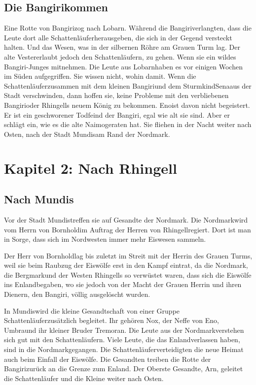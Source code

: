 \documentclass[12pt,a4paper,onecolumn,twoside,ngerman]{book}
\newcommand{\Sena}{Sena}
\newcommand{\Sturmkind}{Sturmkind}
\newcommand{\Bangiri}{Bangiri}
\newcommand{\Enland}{Enland}
\newcommand{\Schattenjager}{Schattenläufer}
\newcommand{\Eno}{Eno}
\newcommand{\Nox}{Nox}
\newcommand{\Umbra}{Umbra}
\newcommand{\Tremor}{Tremor}
\newcommand{\Lobarn}{Lobarn}
\newcommand{\Vester}{Vester}
\newcommand{\Naimo}{Naimo}
\newcommand{\Nordmark}{Nordmark}
\newcommand{\Bergmark}{Bergmark}
\newcommand{\Bornhold}{Bornhold}
\newcommand{\Arn}{Arn}
\newcommand{\Rhingell}{Rhingell}
\newcommand{\Mundis}{Mundis}
\begin{document}
\section{Die \Bangiri kommen}
Eine Rotte von \Bangiri zog nach \Lobarn.
Während die \Bangiri verlangten, dass die Leute dort alle \Schattenjager herausgeben, die sich in der Gegend versteckt halten. Und das Wesen, was in der silbernen Röhre am Grauen Turm lag.
Der alte \Vester erlaubt jedoch den \Schattenjager{n}, zu gehen. Wenn sie ein wildes \Bangiri{-}Junges mitnehmen. Die Leute aus \Lobarn haben es vor einigen Wochen im Süden aufgegriffen. Sie wissen nicht, wohin damit. Wenn die \Schattenjager zusammen mit dem kleinen \Bangiri und dem \Sturmkind \Sena aus der Stadt verschwinden, dann hoffen sie, keine Probleme mit den verbliebenen \Bangiri oder \Rhingell{s} neuem König zu bekommen. \Eno ist davon nicht begeistert. Er ist ein geschworener Todfeind der \Bangiri{,} egal wie alt sie sind. Aber er schlägt ein, wie es die alte \Naimo geraten hat. Sie fliehen in der Nacht weiter nach Osten, nach der Stadt \Mundis am Rand der \Nordmark.

\chapter{Kapitel 2: Nach \Rhingell}

\section{Nach \Mundis}
Vor der Stadt \Mundis treffen sie auf Gesandte der \Nordmark{.} Die \Nordmark wird vom Herrn von \Bornhold im Auftrag der Herren von \Rhingell regiert. Dort ist man in Sorge, dass sich im Nordwesten immer mehr Eiswesen sammeln.

Der Herr von \Bornhold lag bis zuletzt im Streit mit der Herrin des Grauen Turms, weil sie beim Raubzug der Eiswölfe erst in den Kampf  eintrat, da die \Nordmark, die \Bergmark und der Westen \Rhingell{s} so verwüstet waren, dass sich die Eiswölfe ins \Enland begaben, wo sie jedoch von der Macht der Grauen Herrin und ihren Dienern, den \Bangiri, völlig ausgelöscht wurden. 

In \Mundis wird die kleine Gesandtschaft von einer Gruppe \Schattenjager zusätzlich begleitet. Ihr gehören \Nox, der Neffe von \Eno, \Umbra und ihr kleiner Bruder \Tremor an. Die Leute aus der \Nordmark verstehen sich gut mit den \Schattenjager{n}. Viele Leute, die das \Enland verlassen haben, sind in die \Nordmark gegangen. Die \Schattenjager verteidigten die neue Heimat auch beim Einfall der Eiswölfe.
Die Gesandten treiben die Rotte der \Bangiri zurück an die Grenze zum \Enland. Der Oberste Gesandte, \Arn{,} geleitet die Schattenläufer und die Kleine weiter nach Osten.
\end{document}
